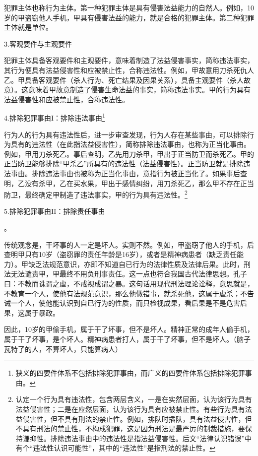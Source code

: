 犯罪主体也称行为主体。第一种犯罪主体是具有侵害法益能力的自然人。例如，10岁的甲盗窃他人手机，甲具有侵害法益的能力，就是合格的犯罪主体。第二种犯罪主体就是单位。

3.客观要件与主观要件

犯罪主体具备客观要件和主观要件，意味着制造了法益侵害事实，简称违法事实，其行为便具有法益侵害性和应被禁止性，合称违法性。例如，甲故意用刀杀死仇人乙。甲具备客观要件（杀人行为、死亡结果及因果关系），具备主观要件（杀人故意）。这意味着甲故意制造了侵害生命法益的事实，简称违法事实。甲的行为具有法益侵害性和应被禁止性，合称违法性。

4.排除犯罪事由I：排除违法事由\footnote{狭义的四要件体系不包括排除犯罪事由，而广义的四要件体系包括排除犯罪事由。}

行为人的行为具有违法性后，进一步审查发现，行为人存在某些事由，可以排除行为具有的违法性（在此指法益侵害性），简称排除违法事由，也称为正当化事由。例如，甲用刀杀死乙。事后查明，乙先用刀杀甲，甲出于正当防卫而杀死乙。甲的正当防卫能够排除“甲杀乙”所具有的违法性（法益侵害性）。正当防卫就是排除违法事由。排除违法事由也被称为正当化事由，意指行为被正当化了。如果事后查明，乙没有杀甲，乙在买水果，甲出于感情纠纷，用刀杀死乙，那么甲不存在正当防卫，最终确定甲制造了违法事实，甲的行为具有违法性。\footnote{认定一个行为具有违法性，包含两层含义，一是在实然层面，认为该行为具有法益侵害性；二是在应然层面，认为该行为具有应被禁止性。有些行为具有法益侵害性，但不具有刑法的禁止性。例如，排队时插队，具有法益侵害性，但不具有刑法的禁止性，不构成犯罪，这是因为刑法是最严厉的制裁措施，要保持谦抑性。排除违法事由中的违法性是指法益侵害性。后文“法律认识错误”中有个“违法性认识可能性”，其中的“违法性”是指刑法的禁止性。}

5.排除犯罪事由II：排除责任事由

。

传统观念是，干坏事的人一定是坏人。实则不然。例如，甲盗窃了他人的手机，后查明甲只有10岁（盗窃罪的责任年龄是16岁），或者是精神病患者（缺乏责任能力）。甲缺乏法规范意识，亦即不知道自已行为的法律性质及法律后果。此时，刑法无法谴责甲，甲最终不用负刑事责任。这一点也符合我国古代法律思想。孔子曰：不教而诛谓之虐，不戒视成谓之暴。这句话用现代刑法理论诠释，意思就是，不教育一个人，使他有法规范意识，那么他做错事，就杀死他，这属于虐杀；不告诫一个人，使他能认识到自已行为的性质，而只检视成果，看后果是不是危害后果，这属于暴政。

因此，10岁的甲偷手机，属于干了坏事，但不是坏人。精神正常的成年人偷手机，属于干了坏事，是个坏人。精神病患者打人，属于干了坏事，但不是坏人。（脑子瓦特了的人，不算坏人，只能算病人）

